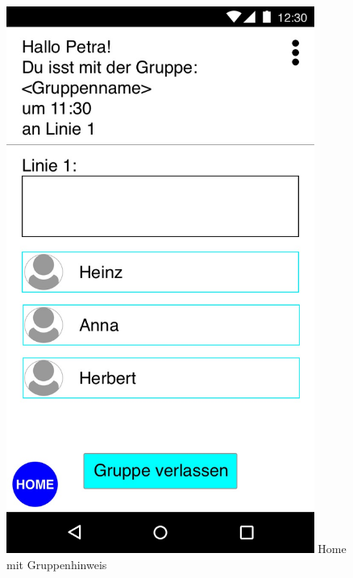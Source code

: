 \documentclass[a4paper]{scrreprt}
\begin{document}
\begin{figure}[H]
	\centering 
	\begin{minipage}[b]{0.48\textwidth} 
		\centering 
		\includegraphics[width=0.9\textwidth]{res/GUI/07.jpeg} 
		\label{Fig.7}
		Home mit Gruppenhinweis
	\end{minipage}
	\begin{minipage}[b]{0.48\textwidth} 
	\end{minipage}
\end{figure}
\end{document}
